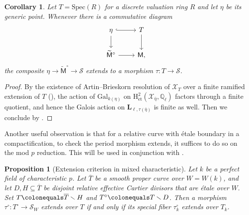 \documentclass[11pt, letterpaper]{amsart}
\theoremstyle{plain}
\newtheorem{proposition}[theorem]{Proposition}
\newtheorem{corollary}[theorem]{Corollary}
\theoremstyle{definition}
\newcommand{\IQ}{\mathbb{Q}}
\newcommand{\Spec}{\mathrm{Spec}}
\newcommand{\<}{\langle}
\renewcommand{\>}{\rangle}
\def\wt{\widetilde}
\newcommand{\Gal}{\mathrm{Gal}}
\newcommand{\et}{\mathrm{{\acute{e}}t}}
\newcommand{\shS}{\mathscr{S}}
\newcommand{\sfM}{\mathsf{M}}
\newcommand{\sX}{\mathcal{X}}
\newcommand{\bL}{\mathbf{L}}
\renewcommand{\H}{\mathrm{H}}
\begin{document}
\begin{corollary}
\label{cor: extend DVR}
    Let $T = \Spec(R)$ for a discrete valuation ring $R$ and let $\eta$ be its generic point. Whenever there is a commutative diagram
    \[\begin{tikzcd}
	\eta & T \\
	{\wt{\sfM}^\circ} & \sfM,
	\arrow[hook, from=1-1, to=1-2]
	\arrow[from=1-1, to=2-1]
	\arrow[from=1-2, to=2-2]
	\arrow[from=2-1, to=2-2]
\end{tikzcd}\]
    the composite $\eta \to \wt{\sfM}^\circ \to \shS$ extends to a morphism $\tau : T \to \shS$. 
\end{corollary}
\begin{proof}
    By the existence of Artin--Brieskorn resolution of $\sX_T$ over a finite ramified extension of $T$ (\cite[Thm.~2]{Artin-Res}), the action of $\Gal_{k(\eta)}$ on $\H^2_\et(\sX_{\bar{\eta}}, \IQ_\ell)$ factors through a finite quotient, and hence the Galois action on $\bL_{\ell, \tau(\bar{\eta})}$ is finite as well. 
    Then we conclude by . 
\end{proof}
Another useful observation is that for a relative curve with \'etale boundary in a compactification, to check the period morphism extends, it suffices to do so on the mod $p$ reduction.
This will be used in conjunction with .
\begin{proposition}[Extension criterion in mixed characteristic]
\label{lem: extend morphism from curve}
    Let $k$ be a perfect field of characteristic $p$. 
    Let $\overline{T}$ be a smooth proper curve over $W=W(k)$, and let $D, H \subseteq \overline{T}$ be disjoint relative effective Cartier divisors that are \'etale over $W$. 
    Set $T \colonequals \overline{T} \smallsetminus H$ and $T^\circ \colonequals T \smallsetminus D$. 
    Then a morphism $\tau^\circ : T^\circ \to \shS_W$ extends over $T$ if and only if its special fiber $\tau^\circ_k$ extends over $T_k$. 
\end{proposition}
\end{document}
